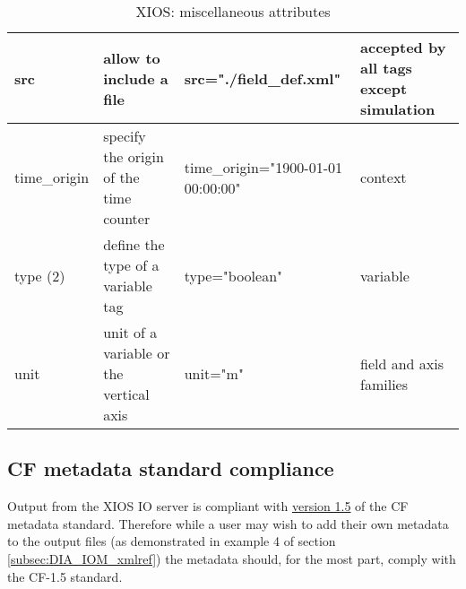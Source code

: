 \documentclass[../main/NEMO_manual]{subfiles}
\begin{document}
\begin{table}
\begin{tabularx}{\textwidth}{|l|X|X|X|}
    \hline
    src                                                                                                  &
    allow to include a file                                                                              &
    src="./field\_def.xml"                                                                               &
    accepted by all tags except simulation \\
    \hline
    time\_origin                                                                                         &
    specify the origin of the time counter                                                               &
    time\_origin="1900-01-01 00:00:00"                                                                   &
    context                                \\
    \hline
    type (2)                                                                                             &
    define the type of a variable tag                                                                    &
    type="boolean"                                                                                       &
    variable                               \\
    \hline
    unit                                                                                                 &
    unit of a variable or the vertical axis                                                              &
    unit="m"                                                                                             &
    field and axis families                \\
    \hline
  \end{tabularx}
  \caption{XIOS: miscellaneous attributes}
\end{table}

\subsection{CF metadata standard compliance}

Output from the XIOS IO server is compliant with
\href{http://cfconventions.org/Data/cf-conventions/cf-conventions-1.5/build/cf-conventions.html}{version 1.5} of
the CF metadata standard.
Therefore while a user may wish to add their own metadata to the output files (as demonstrated in example 4 of
section \autoref{subsec:DIA_IOM_xmlref}) the metadata should, for the most part, comply with the CF-1.5 standard.
\end{document}
